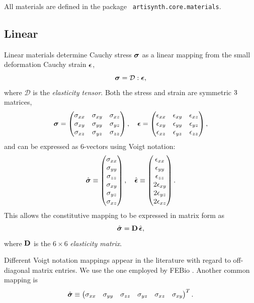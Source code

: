 All materials are defined in the package {\tt
artisynth.core.materials}.

\subsection{Linear}
\label{LinearMaterials:sec}

Linear materials determine Cauchy stress $\boldsymbol\sigma$ as a linear mapping
from the small deformation Cauchy strain $\boldsymbol\epsilon$,
%
\begin{equation}
\boldsymbol\sigma = \mathcal{D} : \boldsymbol\epsilon,
\end{equation}
%
where $\mathcal{D}$ is the {\it elasticity tensor}.
Both the stress and
strain are symmetric $3 \time 3$ matrices,
%
\begin{equation}
\boldsymbol\sigma = \left(\begin{matrix} 
\sigma_{xx} & \sigma_{xy} & \sigma_{xz} \\
\sigma_{xy} & \sigma_{yy} & \sigma_{yz} \\
\sigma_{xz} & \sigma_{yz} & \sigma_{zz}
\end{matrix}\right),
\quad
\boldsymbol\epsilon = \left(\begin{matrix} 
\epsilon_{xx} & \epsilon_{xy} & \epsilon_{xz} \\
\epsilon_{xy} & \epsilon_{yy} & \epsilon_{yz} \\
\epsilon_{xz} & \epsilon_{yz} & \epsilon_{zz}
\end{matrix}\right),
\end{equation}
%
and can be expressed as 6-vectors using Voigt notation:
%
\begin{equation}
\hat{\boldsymbol\sigma} \equiv \left(\begin{matrix} 
\sigma_{xx} \\ \sigma_{yy} \\ \sigma_{zz} \\ 
\sigma_{xy} \\ \sigma_{yz} \\ \sigma_{xz} 
\end{matrix}\right),
\quad
\hat{\boldsymbol\epsilon} \equiv \left(\begin{matrix} 
\epsilon_{xx} \\ \epsilon_{yy} \\ \epsilon_{zz} \\ 
2 \epsilon_{xy} \\ 2 \epsilon_{yz} \\ 2 \epsilon_{xz} 
\end{matrix}\right).
\end{equation}
%
This allows the constitutive mapping to be expressed in
matrix form as
%
\begin{equation}
\hat{\boldsymbol\sigma} = {\bf D} \, \hat{\boldsymbol\epsilon},
\end{equation}
%
where ${\bf D}$ is the $6 \times 6$ {\it elasticity matrix}.

\begin{sideblock}
Different Voigt notation mappings appear in the literature with regard
to off-diagonal matrix entries. We use the one employed by
FEBio \cite{FEBioTheory2018}. Another common mapping is
%
\begin{equation*}
\hat{\boldsymbol\sigma} \equiv \left(\begin{matrix} 
\sigma_{xx} & \sigma_{yy} & \sigma_{zz} & 
\sigma_{yz} & \sigma_{xz} & \sigma_{xy} 
\end{matrix}\right)^T.
\end{equation*}
%
\end{sideblock}

